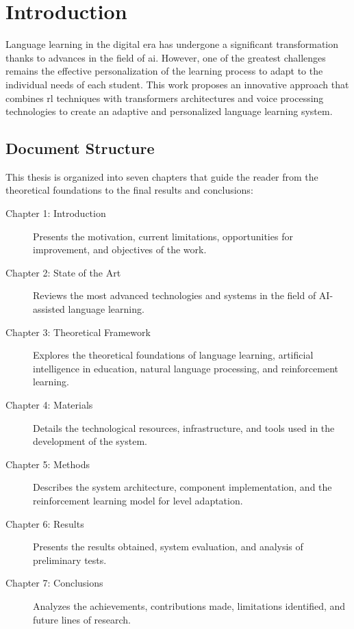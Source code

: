 \chapter{Introduction}
\label{chap:introduction}

Language learning in the digital era has undergone a significant transformation thanks to advances in the field of \gls{ai}. However, one of the greatest challenges remains the effective personalization of the learning process to adapt to the individual needs of each student. This work proposes an innovative approach that combines \gls{rl} techniques with \gls{transformers} architectures and voice processing technologies to create an adaptive and personalized language learning system.

\section{Document Structure}
\label{sec:document-structure}

This thesis is organized into seven chapters that guide the reader from the theoretical foundations to the final results and conclusions:

\begin{description}
  \item[Chapter 1: Introduction] Presents the motivation, current limitations, opportunities for improvement, and objectives of the work.
  
  \item[Chapter 2: State of the Art] Reviews the most advanced technologies and systems in the field of AI-assisted language learning.
  
  \item[Chapter 3: Theoretical Framework] Explores the theoretical foundations of language learning, artificial intelligence in education, natural language processing, and reinforcement learning.
  
  \item[Chapter 4: Materials] Details the technological resources, infrastructure, and tools used in the development of the system.
  
  \item[Chapter 5: Methods] Describes the system architecture, component implementation, and the reinforcement learning model for level adaptation.
  
  \item[Chapter 6: Results] Presents the results obtained, system evaluation, and analysis of preliminary tests.
  
  \item[Chapter 7: Conclusions] Analyzes the achievements, contributions made, limitations identified, and future lines of research.
\end{description}

